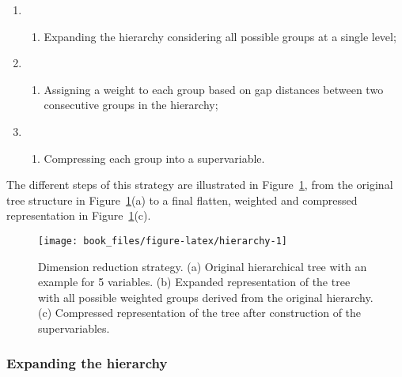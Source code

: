 \documentclass[]{book}
\providecommand{\tightlist}{%
  \setlength{\itemsep}{0pt}\setlength{\parskip}{0pt}}
\begin{document}
\begin{enumerate}
\def\labelenumi{\arabic{enumi}.}
\item
  \begin{enumerate}
  \def\labelenumii{(\alph{enumii})}
  \tightlist
  \item
    Expanding the hierarchy considering all possible groups
    at a single level;
  \end{enumerate}
\item
  \begin{enumerate}
  \def\labelenumii{(\alph{enumii})}
  \setcounter{enumii}{1}
  \tightlist
  \item
    Assigning a weight to each group based on gap distances
    between two consecutive groups in the hierarchy;
  \end{enumerate}
\item
  \begin{enumerate}
  \def\labelenumii{(\alph{enumii})}
  \setcounter{enumii}{1}
  \tightlist
  \item
    Compressing each group into a supervariable.
  \end{enumerate}
\end{enumerate}

The different steps of this strategy are illustrated in
Figure~\ref{fig:hierarchy}, from the original tree structure in
Figure~\ref{fig:hierarchy}(a) to a final flatten, weighted and compressed
representation in Figure~\ref{fig:hierarchy}(c).



\begin{figure}

{\centering \texttt{[image: book\_files/figure-latex/hierarchy-1]} 

}

\caption{Dimension reduction strategy. (a) Original hierarchical tree with an example for 5 variables. (b) Expanded representation of the tree with all possible weighted groups derived from the original hierarchy. (c) Compressed representation of the tree after construction of the supervariables.}\label{fig:hierarchy}
\end{figure}

\hypertarget{expanding-the-hierarchy}{%
\subsubsection*{Expanding the hierarchy}\label{expanding-the-hierarchy}}
\end{document}
